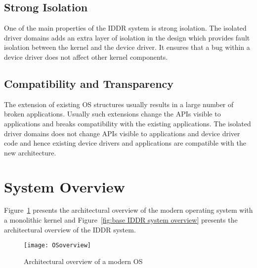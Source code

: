 \subsection*{Strong Isolation}
One of the main properties of the IDDR system is strong isolation. The isolated driver domains adds an extra layer of isolation in the design which provides fault isolation between the kernel and the device driver. It ensures that a bug within a device driver does not affect other kernel components.

\subsection*{Compatibility and Transparency} 
The extension of existing OS structures usually results in a large number of broken applications. Usually such extensions change the APIs visible to applications and breaks compatibility with the existing applications. The isolated driver domains does not change APIs visible to applications and device driver code and hence existing device drivers and applications are compatible with the new architecture.

\section{System Overview}\label{overview}

Figure~\ref{fig:monolithic} presents the architectural overview of the modern operating system with a monolithic kernel and Figure~\ref{fig:base IDDR system overview} presents the architectural overview of the IDDR system.
\\[3mm]
\begin{figure}[!ht]
\centering
\texttt{[image: OSoverview]}
\caption{Architectural overview of a modern OS}
\label{fig:monolithic}
\end{figure}

